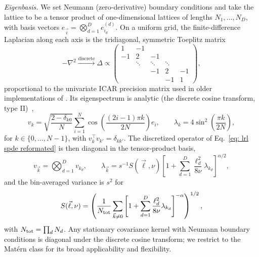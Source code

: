 \textit{Eigenbasis.} We set Neumann (zero-derivative) boundary conditions and take the lattice to be a tensor product of one-dimensional lattices of lengths $N_1, \dots, N_D$, with basis vectors $e_{\vec{i}} = \bigotimes_{d=1}^D e_{i_d}^{(d)}$. On a uniform grid, the finite-difference Laplacian along each axis is the tridiagonal, symmetric Toeplitz matrix
\begin{equation}
    -\nabla^2 \overset{\textrm{discrete}}{\longrightarrow} \Delta \propto \begin{pmatrix}
        1 & -1 &  &  &  \\
        -1 & 2 & -1 &  &  \\
         & \ddots & \ddots & \ddots &  \\
         &  & -1 & 2 & -1  \\
         &  &  & -1 & 1
    \end{pmatrix},
    \label{eq: discrete laplacian}
\end{equation}
proportional to the univariate ICAR precision matrix used in older implementations of \PixelPop. Its eigenspectrum is analytic (the discrete cosine transform, type II)~\cite{Strang:1999dct},
\begin{equation}
    v_{k} = \sqrt{\frac{2-\delta_{k0}}{N}}\sum_{i=1}^{N} \cos\left(\frac{(2i-1)\pi k }{2N}\right) e_i, \qquad
    \lambda_k = 4\sin^2\left(\frac{\pi k}{2N}\right),
\end{equation}
for $k \in \{0, \dots, N-1\}$, with $v_k^\top v_{k'} = \delta_{kk'}$. The discretized operator of Eq.~\eqref{eq: lrl spde reformated} is then diagonal in the tensor-product basis,
\begin{equation}
    v_{\vec{k}} = \bigotimes_{d=1}^{D}v_{k_d}, \qquad
    \lambda_{\vec{k}} = s^{-1}S(\vec{\ell},\nu)\left[1 + \sum_{d=1}^D \frac{\ell_d^2}{8\nu}\lambda_{k_d}\right]^{\alpha/2},
\end{equation}
and the bin-averaged variance is $s^2$ for
\begin{equation}
    S(\vec{\ell},\nu) = \left(\frac{1}{N_{\rm tot}}\sum_{\vec{k}\neq 0}\left[1 + \sum_{d=1}^D \frac{\ell_d^2}{8\nu}\lambda_{k_d}\right]^{-\alpha}\right)^{1/2},
    \label{eq: s normalization}
\end{equation}
with $N_{\rm tot} = \prod_d N_d$. Any stationary covariance kernel with Neumann boundary conditions is diagonal under the discrete cosine transform; we restrict to the Mat\'ern class for its broad applicability and flexibility.

